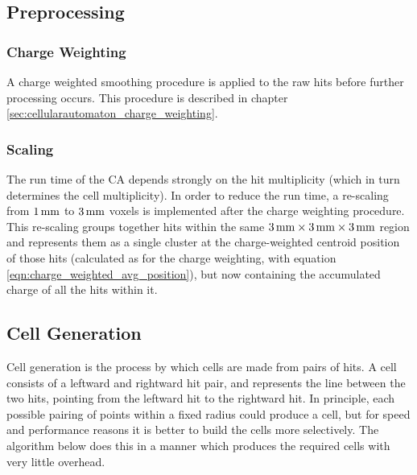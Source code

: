 \subsection{Preprocessing}\label{sec:cellularautomaton_preprocessing}
\subsubsection{Charge Weighting}\label{sec:cellularautomaton_preprocessing_charge_weighting}
A charge weighted smoothing procedure is applied to the raw hits before further processing occurs. This procedure is described in chapter \ref{sec:cellularautomaton_charge_weighting}.

\subsubsection{Scaling}\label{sec:cellularautomaton_scaling}
The run time of the \ac{CA} depends strongly on the hit multiplicity (which in turn determines the cell multiplicity). In order to reduce the run time, a re-scaling from $1\,\mathrm{mm}$ to $3\,\mathrm{mm}$ voxels is implemented after the charge weighting procedure. This re-scaling groups together hits within the same $3\,\mathrm{mm} \times 3\,\mathrm{mm} \times 3\,\mathrm{mm}$ region and represents them as a single cluster at the charge-weighted centroid position of those hits (calculated as for the charge weighting, with equation \ref{eqn:charge_weighted_avg_position}), but now containing the accumulated charge of all the hits within it.

\subsection{Cell Generation}\label{sec:cellularautomaton_cell_generation}
Cell generation is the process by which cells are made from pairs of hits. A cell consists of a leftward and rightward hit pair, and represents the line between the two hits, pointing from the leftward hit to the rightward hit.  In principle, each possible pairing of points within a fixed radius could produce a cell, but for speed and performance reasons it is better to build the cells more selectively. The algorithm below does this in a manner which produces the required cells with very little overhead.

